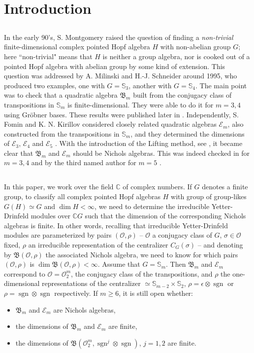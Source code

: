 \documentclass[11pt]{amsart} \textheight 22cm
\renewcommand{\^}[1]{\mbox{$^{\left( #1 \right)}$}}
\renewcommand{\_}[1]{\mbox{$_{\left( #1 \right)}$}}
\newcommand\toba{{\mathfrak B }}
\newcommand{\ku}{\mathbb C}
\newcommand{\Ee}{{\mathcal E}}
\newcommand{\Oc}{{\mathcal O}}
\newcommand\sgn{\operatorname{sgn}}
\theoremstyle{plain}
\theoremstyle{definition}
\theoremstyle{remark}
\newcommand\st{\mathbb S_3}
\newcommand\sk{\mathbb S_4}
\newcommand\sm{\mathbb S_m}
\newcommand\s{\mathbb S}
\theoremstyle{remark}
\begin{document}
\section{Introduction}\label {0}
\subsection{}
In the early 90's, S. Montgomery raised the question of finding a
\emph{non-trivial} finite-dimensional complex pointed Hopf algebra
$H$ with non-abelian group $G$; here ``non-trivial" means that $H$
is neither a group algebra, nor is  cooked out of a pointed Hopf
algebra with abelian group by some kind of extension. This
question was addressed by A. Milinski and H.-J. Schneider around
1995, who produced two examples, one with $G = \st$, another with
$G = \sk$. The main point was to check that a quadratic algebra
$\toba_m$ built from the conjugacy class of transpositions in
$\sm$ is finite-dimensional. They were able to do it for $m=3,4$
using Gr\"obner bases.  These results were published later in
\cite{MS}. Independently, S. Fomin and K.  N. Kirillov considered
closely related quadratic algebras $\Ee_m$, also constructed from
the transpositions in $\sm$, and they determined the dimensions of
$\Ee_3$, $\Ee_4$ and $\Ee_5$ \cite{FK}.  With the introduction of
the Lifting method, see \cite{AS-cambr}, it became clear that
$\toba_m$ and $\Ee_m$ should be Nichols algebras. This was indeed
checked in \cite{MS} for $m=3,4$ and by the third named author for
$m=5$ \cite{G2}.


\medbreak\subsection{} In this paper, we work over the field $\ku$
of complex numbers. If $G$ denotes a finite group, to classify all
complex pointed Hopf algebras $H$ with group of group-likes
$G(H)\simeq G$ and $\dim H<\infty$, we need to determine the
irreducible Yetter-Drinfeld modules over $\ku G$ such that the
dimension of the corresponding Nichols algebras is finite. In
other words, recalling that irreducible Yetter-Drinfeld modules
are parameterized by pairs $(\Oc, \rho)$ -- $\Oc$ a conjugacy
class of $G$, $\sigma\in \Oc$ fixed, $\rho$ an irreducible
representation of the centralizer $C_{G}(\sigma)$ -- and denoting
by $\toba(\Oc, \rho)$ the associated Nichols algebra, we need to
know for which pairs $(\Oc, \rho)$ is $\dim\toba(\Oc, \rho) <
\infty$.  Assume that $G = \sm$. Then $\toba_m$ and $\Ee_m$
correspond to $\Oc = \Oc_2^m$, the conjugacy class of the
transpositions, and $\rho$ the one-dimensional representations of
the centralizer $\simeq \s_{m-2}\times \s_2$,
$\rho=\epsilon\otimes\sgn$ or $\rho=\sgn\otimes\sgn$ respectively.
If $m\geq 6$, it is still open whether:
\begin{itemize}
    \item $\toba_m$ and $\Ee_m$ are Nichols algebras,
    \item the dimensions of $\toba_m$ and $\Ee_m$ are finite,
    \item the dimensions of $\toba(\Oc_2^m, \sgn^j\otimes \sgn)$, $j=1,2$ are
    finite.
\end{itemize}
\end{document}
